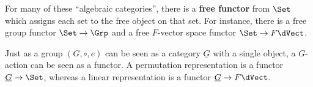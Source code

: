 \documentclass[a5paper]{article}
\begin{document}
\begin{example*}
	For many of these ``algebraic categories'', there is a \textbf{free functor}
  from $\Set$ which assigns each set to the free object on that set. For
  instance, there is a free group functor $\Set\to\Grp$ and a free
  $F$-vector space functor $\Set\to F\dVect$.

  Just as a group $(G,\circ,e)$ can be seen as a category $\underline{G}$ with a
  single object, a $G$-action can be seen as a functor. A permutation
  representation is a functor $\underline{G}\to\Set$, whereas a linear
  representation is a functor $\underline{G}\to F\dVect$.
\end{example*}

\end{document}
